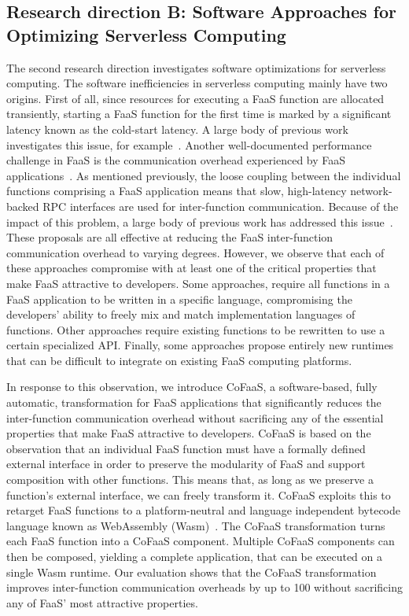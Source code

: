 \documentclass[../main.tex]{subfiles}
\begin{document}
\begin{refsection}
\subsection{Research direction B: Software Approaches for Optimizing Serverless Computing}
\label{sec:pc3}
The second research direction investigates software optimizations for
serverless computing. The software inefficiencies in serverless
computing mainly have two origins. First of all, since resources for
executing a FaaS function are allocated transiently, starting a FaaS
function for the first time is marked by a significant latency known
as the cold-start latency. A large body of previous work investigates
this issue, for
example~\cite{du20_catal,ustiugov21_bench_analy_optim_server_funct_snaps}. Another
well-documented performance challenge in FaaS is the communication
overhead experienced by FaaS
applications~\cite{gan19_open_sourc_bench_suite_micros,stellar}. As
mentioned previously, the loose coupling between the individual
functions comprising a FaaS application means that slow, high-latency
network-backed RPC interfaces are used for inter-function
communication. Because of the impact of this problem, a large body of
previous work has addressed this issue~\cite{kotni21_faast,
  mahgoub22_wisef,
  barcelona-pons19_faas_track,sreekanti20_cloud,shillaker20_faasm,jia21_night}. These
proposals are all effective at reducing the FaaS inter-function
communication overhead to varying degrees. However, we observe that
each of these approaches compromise with at least one of the critical
properties that make FaaS attractive to developers. Some approaches,
require all functions in a FaaS application to be written in a
specific language, compromising the developers' ability to freely mix
and match implementation languages of functions.  Other approaches
require existing functions to be rewritten to use a certain
specialized API. Finally, some approaches propose entirely new
runtimes that can be difficult to integrate on existing FaaS computing
platforms.

In response to this observation, we introduce CoFaaS, a
software-based, fully automatic, transformation for FaaS applications
that significantly reduces the inter-function communication
overhead without sacrificing any of the essential properties that make
FaaS attractive to developers. CoFaaS is based on the observation that
an individual FaaS function must have a formally defined external
interface in order to preserve the modularity of FaaS and support
composition with other functions. This means that, as long as we
preserve a function's external interface, we can freely transform
it. CoFaaS exploits this to retarget FaaS functions to a
platform-neutral and language independent bytecode language known as
WebAssembly (Wasm)~\cite{rossberg22_webas_core_specif}. The CoFaaS
transformation turns each FaaS function into a CoFaaS
component. Multiple CoFaaS components can then be composed, yielding a
complete application, that can be executed on a single Wasm
runtime. Our evaluation shows that the CoFaaS transformation improves
inter-function communication overheads by up to 100\texttimes{}
without sacrificing any of FaaS' most attractive properties.



\end{refsection}
\end{document}
